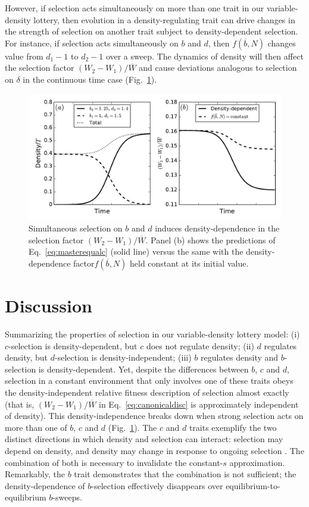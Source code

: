 \documentclass[12pt]{article}
\begin{document}
However, if selection acts simultaneously on more than one trait in our variable-density lottery, then evolution in a density-regulating trait can drive changes in the strength of selection on another trait subject to density-dependent selection. For instance, if selection acts simultaneously on $b$ and $d$, then $f(\overline{b},N)$ changes value from $d_1-1$ to $d_2-1$ over a sweep. The dynamics of density will then affect the selection factor $(W_2-W_1)/\overline{W}$ and cause deviations analogous to selection on $\delta$ in the continuous time case (Fig.~\ref{fig:bdsweep}). 

\begin{figure}
\centering
\includegraphics[scale=0.8]{bdsweep.pdf}
\caption{\label{fig:bdsweep} Simultaneous selection on $b$ and $d$ induces density-dependence in the selection factor $(W_2-W_1)/\overline{W}$. Panel (b) shows the predictions of Eq.~\eqref{eq:masterequalc} (solid line) versus the same with the density-dependence factor$f(\overline{b},N)$ held constant at its initial value.}
\end{figure}


\section*{Discussion}

Summarizing the properties of selection in our variable-density lottery model: (i) $c$-selection is density-dependent, but $c$ does not regulate density; (ii) $d$ regulates density, but $d$-selection is density-independent; (iii) $b$ regulates density and $b$-selection is density-dependent. Yet, despite the differences between $b$, $c$ and $d$,  selection in a constant environment that only involves one of these traits obeys the density-independent relative fitness description of selection almost exactly (that is, $(W_2-W_1)/\overline{W}$ in Eq.~\eqref{eq:canonicaldisc} is approximately independent of density). This density-independence breaks down when strong selection acts on more than one of $b$, $c$ and $d$ (Fig.~\ref{fig:bdsweep}). The $c$ and $d$ traits exemplify the two distinct directions in which density and selection can interact: selection may depend on density, and density may change in response to ongoing selection \citep{prout_1980}. The combination of both is necessary to invalidate the constant-$s$ approximation. Remarkably, the $b$ trait demonstrates that the combination is not sufficient; the density-dependence of $b$-selection effectively disappears over equilibrium-to-equilibrium $b$-sweeps. 
\end{document}
